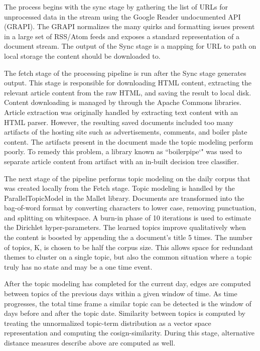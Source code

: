 \documentclass[10pt,twocolumn]{article}
\begin{document}
The process begins with the sync stage by gathering the list of URLs for unprocessed data in the stream using the Google Reader undocumented API (GRAPI).  The GRAPI normalizes the many quirks and formatting issues present in a large set of RSS/Atom feeds and exposes a standard representation of a document stream.  The output of the Sync stage is a mapping for URL to path on local storage the content should be downloaded to.

The fetch stage of the processing pipeline is run after the Sync stage generates output.  This stage is responsible for downloading HTML content, extracting the relevant article content from the raw HTML, and saving the result to local disk.  Content downloading is managed by through the Apache Commons libraries.  Article extraction was originally handled by extracting text content with an HTML parser.  However, the resulting saved documents included too many artifacts of the hosting site such as advertisements, comments, and boiler plate content.  The artifacts present in the document made the topic modeling perform poorly.  To remedy this problem, a library known as ``boilerpipe`" was used to separate article content from artifact with an in-built decision tree classifier.

The next stage of the pipeline performs topic modeling on the daily corpus that was created locally from the Fetch stage.  Topic modeling is handled by the ParallelTopicModel in the Mallet library.  Documents are transformed into the bag-of-word format by converting characters to lower case, removing punctuation, and splitting on whitespace.  A burn-in phase of 10 iterations is used to estimate the Dirichlet hyper-parameters. The learned topics improve qualitatively when the content is boosted by appending the a document's title 5 times.  The number of topics, K, is chosen to be half the corpus size.  This allows space for redundant themes to cluster on a single topic, but also the common situation where a topic truly has no state and may be a one time event.

After the topic modeling has completed for the current day, edges are computed between topics of the previous days within a given window of time.  As time progresses, the total time frame a similar topic can be detected is the window of days before and after the topic date.  Similarity between topics is computed by treating the unnormalized topic-term distribution as a vector space representation and computing the cosign-similarity.  During this stage, alternative distance measures describe above are computed as well. 
\end{document}

